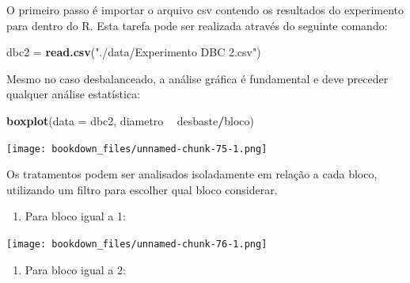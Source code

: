\documentclass[
]{article}
\newenvironment{Shaded}{\begin{snugshade}}{\end{snugshade}}
\newcommand{\DataTypeTok}[1]{\textcolor[rgb]{0.13,0.29,0.53}{#1}}
\newcommand{\DecValTok}[1]{\textcolor[rgb]{0.00,0.00,0.81}{#1}}
\newcommand{\KeywordTok}[1]{\textcolor[rgb]{0.13,0.29,0.53}{\textbf{#1}}}
\newcommand{\NormalTok}[1]{#1}
\newcommand{\OperatorTok}[1]{\textcolor[rgb]{0.81,0.36,0.00}{\textbf{#1}}}
\newcommand{\StringTok}[1]{\textcolor[rgb]{0.31,0.60,0.02}{#1}}
\providecommand{\tightlist}{%
  \setlength{\itemsep}{0pt}\setlength{\parskip}{0pt}}
\begin{document}
O primeiro passo é importar o arquivo csv contendo os resultados do experimento para dentro do R. Esta tarefa pode ser realizada através do seguinte comando:

\begin{Shaded}
\begin{Highlighting}[]
\NormalTok{dbc2 =}\StringTok{ }\KeywordTok{read.csv}\NormalTok{(}\StringTok{"./data/Experimento DBC 2.csv"}\NormalTok{)}
\end{Highlighting}
\end{Shaded}

Mesmo no caso desbalanceado, a análise gráfica é fundamental e deve preceder qualquer análise estatística:

\begin{Shaded}
\begin{Highlighting}[]
\KeywordTok{boxplot}\NormalTok{(}\DataTypeTok{data =}\NormalTok{ dbc2, diametro }\OperatorTok{~}\StringTok{ }\NormalTok{desbaste}\OperatorTok{/}\NormalTok{bloco)}
\end{Highlighting}
\end{Shaded}

\texttt{[image: bookdown\_files/unnamed-chunk-75-1.png]}

Os tratamentos podem ser analisados isoladamente em relação a cada bloco, utilizando um filtro para escolher qual bloco considerar.

\begin{enumerate}
\def\labelenumi{\arabic{enumi}.}
\tightlist
\item
  Para bloco igual a 1:
\end{enumerate}

\begin{Shaded}
\end{Shaded}

\texttt{[image: bookdown\_files/unnamed-chunk-76-1.png]}

\begin{enumerate}
\def\labelenumi{\arabic{enumi}.}
\setcounter{enumi}{1}
\tightlist
\item
  Para bloco igual a 2:
\end{enumerate}
\end{document}
